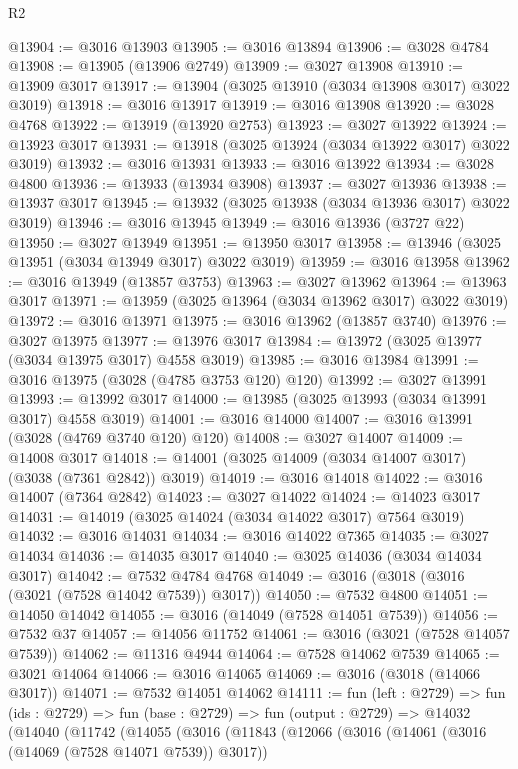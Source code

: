 \begin{lexlean}{R2}
\begin{coremodule}
@13904 := @3016 @13903
@13905 := @3016 @13894
@13906 := @3028 @4784
@13908 := @13905 (@13906 @2749)
@13909 := @3027 @13908
@13910 := @13909 @3017
@13917 := @13904 (@3025 @13910 (@3034 @13908 @3017) @3022 @3019)
@13918 := @3016 @13917
@13919 := @3016 @13908
@13920 := @3028 @4768
@13922 := @13919 (@13920 @2753)
@13923 := @3027 @13922
@13924 := @13923 @3017
@13931 := @13918 (@3025 @13924 (@3034 @13922 @3017) @3022 @3019)
@13932 := @3016 @13931
@13933 := @3016 @13922
@13934 := @3028 @4800
@13936 := @13933 (@13934 @3908)
@13937 := @3027 @13936
@13938 := @13937 @3017
@13945 := @13932 (@3025 @13938 (@3034 @13936 @3017) @3022 @3019)
@13946 := @3016 @13945
@13949 := @3016 @13936 (@3727 @22)
@13950 := @3027 @13949
@13951 := @13950 @3017
@13958 := @13946 (@3025 @13951 (@3034 @13949 @3017) @3022 @3019)
@13959 := @3016 @13958
@13962 := @3016 @13949 (@13857 @3753)
@13963 := @3027 @13962
@13964 := @13963 @3017
@13971 := @13959 (@3025 @13964 (@3034 @13962 @3017) @3022 @3019)
@13972 := @3016 @13971
@13975 := @3016 @13962 (@13857 @3740)
@13976 := @3027 @13975
@13977 := @13976 @3017
@13984 := @13972 (@3025 @13977 (@3034 @13975 @3017) @4558 @3019)
@13985 := @3016 @13984
@13991 := @3016 @13975 (@3028 (@4785 @3753 @120) @120)
@13992 := @3027 @13991
@13993 := @13992 @3017
@14000 := @13985 (@3025 @13993 (@3034 @13991 @3017) @4558 @3019)
@14001 := @3016 @14000
@14007 := @3016 @13991 (@3028 (@4769 @3740 @120) @120)
@14008 := @3027 @14007
@14009 := @14008 @3017
@14018 := @14001 (@3025 @14009 (@3034 @14007 @3017) (@3038 (@7361 @2842)) @3019)
@14019 := @3016 @14018
@14022 := @3016 @14007 (@7364 @2842)
@14023 := @3027 @14022
@14024 := @14023 @3017
@14031 := @14019 (@3025 @14024 (@3034 @14022 @3017) @7564 @3019)
@14032 := @3016 @14031
@14034 := @3016 @14022 @7365
@14035 := @3027 @14034
@14036 := @14035 @3017
@14040 := @3025 @14036 (@3034 @14034 @3017)
@14042 := @7532 @4784 @4768
@14049 := @3016 (@3018 (@3016 (@3021 (@7528 @14042 @7539)) @3017))
@14050 := @7532 @4800
@14051 := @14050 @14042
@14055 := @3016 (@14049 (@7528 @14051 @7539))
@14056 := @7532 @37
@14057 := @14056 @11752
@14061 := @3016 (@3021 (@7528 @14057 @7539))
@14062 := @11316 @4944
@14064 := @7528 @14062 @7539
@14065 := @3021 @14064
@14066 := @3016 @14065
@14069 := @3016 (@3018 (@14066 @3017))
@14071 := @7532 @14051 @14062
@14111 := fun (left : @2729) =>
  fun (ids : @2729) =>
  fun (base : @2729) =>
  fun (output : @2729) =>
  @14032
    (@14040
      (@11742
        (@14055
          (@3016
            (@11843
              (@12066
                (@3016
                  (@14061 (@3016 (@14069 (@7528 @14071 @7539)) @3017))

\end{coremodule}
\end{lexlean}
